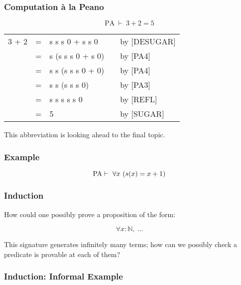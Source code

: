 \documentclass{beamer}
\theoremstyle{indentDefn} \newtheorem{defn}[]{Definition}
\begin{document}
\begin{frame}
	\frametitle{Computation \`{a} la Peano}

	$$ \text{PA} \ \vdash \ 3 + 2 = 5$$

	\begin{tabular}{r c l c l}
		3 + 2 & = & s s s 0 + s s 0   & & by [DESUGAR] \\
		      & = & s (s s s 0 + s 0) & & by [PA4] \\
			  & = & s s (s s s 0 + 0) & & by [PA4] \\
			  & = & s s (s s s 0)	  & & by [PA3] \\
			  & = & s s s s s 0		  & & by [REFL] \\
			  & = & 5				  & & by [SUGAR]
	\end{tabular}



	\vspace{30mm}

	This abbreviation is looking ahead to the final topic. 
\end{frame}

\begin{frame}
	\frametitle{Example}

	$$ \text{PA} \vdash \ \forall x \ (s(x) = x + 1)$$

	\vspace{65mm}

\end{frame}

\begin{frame}
	\frametitle{Induction}

	How could one possibly prove a proposition of the form: 

	$$\forall x : \mathbb{N}, \ \dots$$

	This signature generates infinitely many terms; how can we possibly check a predicate is provable at each of them? 

	\vspace{40mm}
\end{frame}

\begin{frame}
	\frametitle{Induction: Informal Example}
\end{frame}
\end{document}
